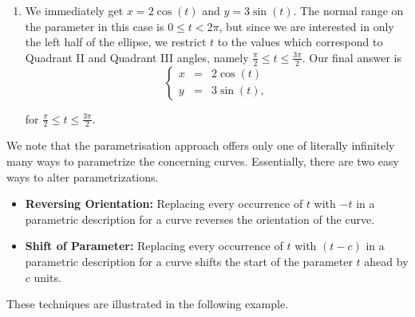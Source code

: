 \begin{example}
\begin{enumerate}
\item  We immediately get  $x = 2\cos(t)$ and $y = 3\sin(t)$.  The normal range on the parameter in this case is $0 \leq t < 2\pi$, but since we are interested in only the left half of the ellipse, we restrict $t$ to the values which correspond to Quadrant II and Quadrant III angles, namely  $\frac{\pi}{2} \leq t \leq \frac{3\pi}{2}$.   Our final answer is 
$$
\left\{\begin{array}{rcl} x & = & 2 \cos(t)\\ y & = & 3 \sin(t), \end{array}\right.
$$ 

for $\frac{\pi}{2} \leq t \leq \frac{3\pi}{2}$. 
\end{enumerate}
\end{example}


We note that the parametrisation approach offers only one of literally infinitely many ways to parametrize the concerning curves. Essentially, there are two easy ways to alter parametrizations.

\begin{itemize}

\item  \textbf{Reversing Orientation:}  Replacing every occurrence of $t$ with $-t$ in a parametric description for a curve reverses the orientation of the curve.  

\item  \textbf{Shift of Parameter:}  Replacing every occurrence of $t$ with $(t-c)$ in a parametric description for a curve shifts the start of the parameter $t$ ahead by $c$ units.

\end{itemize}

These techniques are illustrated in the following example.


